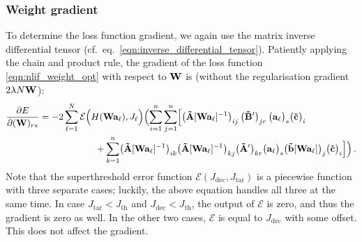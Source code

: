 \subsubsection{Weight gradient}
To determine the loss function gradient, we again use the matrix inverse differential tensor (cf.~eq.~\ref{eqn:inverse_differential_tensor}).
Patiently applying the chain and product rule, the gradient of the loss function \cref{eqn:nlif_weight_opt} with respect to $\mathbf{W}$ is (without the regularisation gradient $2 \lambda N \mathbf{W}$):
\begin{align}
	\begin{aligned}
	\frac{\partial E}{\partial ( \mathbf{W})_{rs}} &=
		-2 \sum_{\ell = 1}^N \mathcal{E} \Bigl( H(\mathbf{W} \mathbf{a}_\ell), J_\ell \Bigr)
		\Bigl(
			\sum_{i = 1}^n
			\sum_{j = 1}^n
			\Bigl[
				\bigl( \mathbf{\tilde A}[\mathbf{W} \mathbf{a}_\ell]^{-1} \bigr)_{ij}
				\hspace{0.2em} \bigl( \mathbf{\tilde B}' \bigr)_{jr}
				\hspace{0.2em} \bigl( \mathbf{a}_\ell \bigr)_{s}
				\bigl( \mathbf{\tilde c} \bigr)_i \\
	& \hspace{6.025em}
			+
				\sum_{k = 1}^n
				\bigl( \mathbf{\tilde A}[\mathbf{W} \mathbf{a}_\ell]^{-1} \bigr)_{ik}
				\bigl( \mathbf{\tilde A}[\mathbf{W} \mathbf{a}_\ell]^{-1} \bigr)_{kj}
				\bigl( \mathbf{\tilde A}' \bigr)_{kr}
				\bigl( \mathbf{a}_\ell \bigr)_{s}
				\bigl( \mathbf{\tilde b}[\mathbf{W} \mathbf{a}_\ell] \bigr)_{j}
				\bigl( \mathbf{\tilde c} \bigr)_i 
			\Bigr]
		\Bigr)\,.
	\end{aligned}
	\label{eqn:nlif_weight_opt_gradient}
\end{align}
Note that the superthreshold error function $\mathcal{E}(J_\mathrm{dec}, J_\mathrm{tar})$ is a piecewise function with three separate cases; luckily, the above equation handles all three at the same time.
In case $J_\mathrm{tar} < J_\mathrm{th}$ and $J_\mathrm{dec} < J_\mathrm{th}$, the output of $\mathcal{E}$ is zero, and thus the gradient is zero as well.
In the other two cases, $\mathcal{E}$ is equal to $J_\mathrm{dec}$ with some offset.
This does not affect the gradient.

